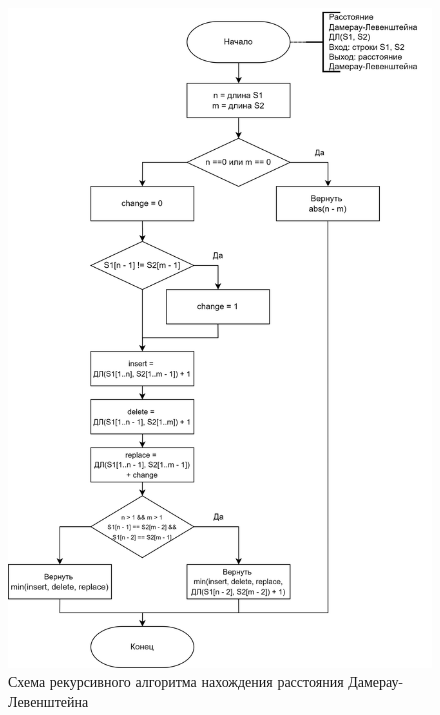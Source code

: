\begin{figure}[h]
	\centering
	\includegraphics[height=0.8\textheight]{img/dlrec.png}
	\caption{Схема рекурсивного алгоритма нахождения расстояния Дамерау-Левенштейна}
	\label{fig:DLrec}
\end{figure}

\clearpage

